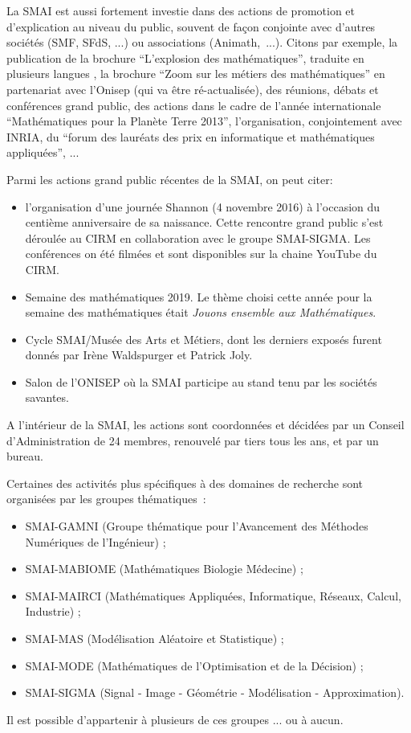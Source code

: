 La SMAI est aussi fortement investie dans des actions
de promotion et d'explication au niveau du public,
souvent de fa\c con conjointe avec d'autres soci\'et\'es
(SMF, SFdS, ...) ou associations (Animath,~...).  Citons
par exemple, la publication de la brochure ``L'explosion
des math\'ematiques'', traduite en plusieurs langues
, la brochure ``Zoom sur les m\'etiers
des math\'ematiques'' en partenariat avec l'Onisep (qui va \^etre r\'e-actualis\'ee),
des r\'eunions, d\'ebats et conf\'erences grand public, des actions
dans le cadre de l'ann\'ee internationale
``Math\'ematiques pour la Plan\`ete Terre 2013'',
l'organisation, conjointement avec INRIA, du
``forum des laur\'eats des prix en informatique
et math\'ematiques appliqu\'ees'', ...

Parmi les actions grand public r\'ecentes de la SMAI, on peut citer:
\begin{itemize}
 \item l'organisation d'une journ\'ee Shannon (4 novembre 2016) \`a l'occasion du centi\`eme anniversaire de sa naissance.
 Cette rencontre grand public s'est d\'eroul\'ee au CIRM en collaboration avec le groupe SMAI-SIGMA.
Les conf\'erences on \'et\'e  film\'ees et sont disponibles sur la chaine YouTube du CIRM.
\item Semaine des math\'ematiques 2019. Le th\`eme choisi cette ann\'ee pour la semaine des math\'ematiques \'etait \textit{Jouons ensemble aux Math\'ematiques}.
\item Cycle SMAI/Mus\'ee des Arts et M\'etiers, dont les derniers expos\'es furent donn\'es par Ir\`ene Waldspurger et Patrick Joly. 
\item Salon de l'ONISEP o\`u la SMAI participe au stand tenu par les soci\'et\'es savantes.
\end{itemize}

A l'int\'erieur de la SMAI, les actions sont coordonn\'ees et d\'ecid\'ees par un
Conseil d'Administration de 24 membres, renouvel\'e par tiers tous
les ans, et par un bureau.

Certaines des activit\'es plus sp\'ecifiques
\`a des domaines de recherche sont organis\'ees
par les groupes th\'ematiques~:
\begin{itemize}%
    \item SMAI-GAMNI (Groupe th\'ematique pour l'Avancement des M\'ethodes Num\'eriques de l'Ing\'enieur) ;
    \item SMAI-MABIOME (Math\'ematiques Biologie M\'edecine) ;
    \item SMAI-MAIRCI (Math\'ematiques Appliqu\'ees, Informatique, R\'eseaux, Calcul, Industrie) ;
    \item SMAI-MAS (Mod\'elisation Al\'eatoire et Statistique) ;
    \item SMAI-MODE  (Math\'ematiques de l'Optimisation et de la D\'ecision) ;
    \item SMAI-SIGMA (Signal - Image - G\'eom\'etrie - Mod\'elisation - Approximation).
\end{itemize}
Il est possible d'appartenir \`a plusieurs de ces groupes ... ou \`a aucun.


